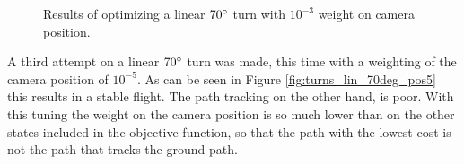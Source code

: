 \begin{figure}
{	\qquad
	}
	\caption{Results of optimizing a linear $70\degree$ turn with $10^{-3}$ weight on camera position.}
	\label{fig:turns_lin_70deg_pos3}
\end{figure}

A third attempt on a linear $70\degree$ turn was made, this time with a weighting of the camera position of $10^{-5}$. As can be seen in Figure \ref{fig:turns_lin_70deg_pos5} this results in a stable flight. The path tracking on the other hand, is poor. With this tuning the weight on the camera position is so much lower than on the other states included in the objective function, so that the path with the lowest cost is not the path that tracks the ground path.

